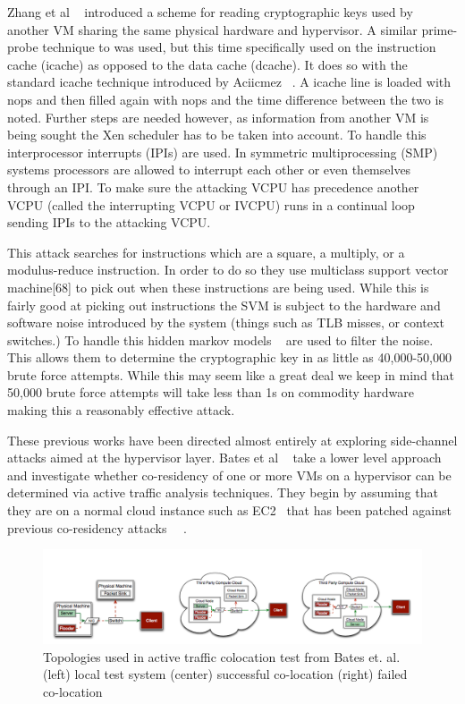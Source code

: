 Zhang et al ~\cite{zhang_cross-vm_2012} introduced a scheme for reading cryptographic keys used by another VM sharing the same physical hardware and hypervisor. A similar prime-probe technique to was used, but this time specifically used on the instruction cache (icache) as opposed to the data cache (dcache). It does so with the standard icache technique introduced by Aciicmez ~\cite{aciiamez_yet_2007}. A icache line is loaded with nops and then filled again with nops and the time difference between the two is noted. Further steps are needed however, as information from another VM is being sought the Xen scheduler has to be taken into account. To handle this interprocessor interrupts (IPIs) are used. In symmetric multiprocessing (SMP) systems processors are allowed to interrupt each other or even themselves through an IPI. To make sure the attacking VCPU has precedence another VCPU (called the interrupting VCPU or IVCPU) runs in a continual loop sending IPIs to the attacking VCPU.

This attack searches for instructions which are a square, a multiply, or a modulus-reduce instruction. In order to do so they use multiclass support vector machine[68] to pick out when these instructions are being used. While this is fairly good at picking out instructions the SVM is subject to the hardware and software noise introduced by the system (things such as TLB misses, or context switches.) To handle this hidden markov models ~\cite{bishop_pattern_2006} are used to filter the noise. This allows them to determine the cryptographic key in as little as 40,000-50,000 brute force attempts. While this may seem like a great deal we keep in mind that 50,000 brute force attempts will take less than 1s on commodity hardware making this a reasonably effective attack. 

These previous works have been directed almost entirely at exploring side-channel attacks aimed at the hypervisor layer. Bates et al ~\cite{bates_detecting_2012} take a lower level approach and investigate whether co-residency of one or more VMs on a hypervisor can be determined via active traffic analysis techniques. They begin by assuming that they are on a normal cloud instance such as EC2~\cite{_aws_EC2_2014} that has been patched against previous co-residency attacks ~\cite{zhang_homealone:_2011}~\cite{ristenpart_hey_2009}. 

\begin{figure}\label{BatesNetworkThing}
	  \centering
	  \includegraphics[width=\textwidth]{figures/batesNetwork.png}
	  \caption{Topologies used in active traffic colocation test from Bates et. al. ~\cite{bates_detecting_2012}
	  (left) local test system 	(center) successful co-location   (right) failed co-location }
\end{figure}




